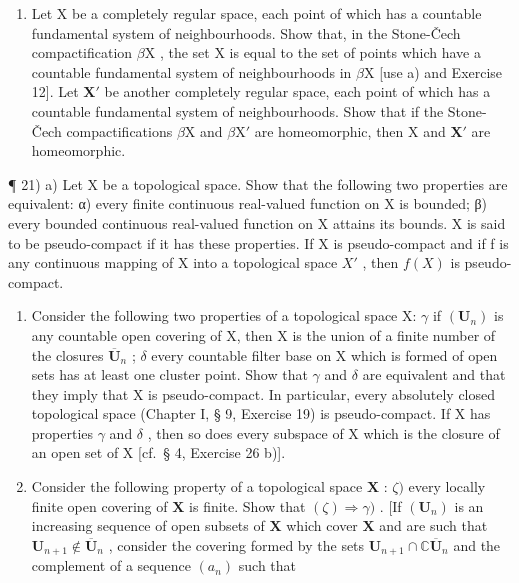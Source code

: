 \begin{enumerate}
\def\labelenumi{\alph{enumi})}
\setcounter{enumi}{1}
\tightlist
\item
  Let X be a completely regular space, each point of which has a countable fundamental system of neighbourhoods. Show that, in the Stone-Čech compactification \(\beta\mathrm{X}\) , the set X is equal to the set of points which have a countable fundamental system of neighbourhoods in \(\beta\mathrm{X}\) {[}use a) and Exercise 12{]}. Let \(\mathbf{X}'\) be another completely regular space, each point of which has a countable fundamental system of neighbourhoods. Show that if the Stone-Čech compactifications \(\beta\mathrm{X}\) and \(\beta\mathrm{X}'\) are homeomorphic, then X and \(\mathbf{X}'\) are homeomorphic.
\end{enumerate}

¶ 21) a) Let X be a topological space. Show that the following two properties are equivalent: α) every finite continuous real-valued function on X is bounded; β) every bounded continuous real-valued function on X attains its bounds. X is said to be pseudo-compact if it has these properties. If X is pseudo-compact and if f is any continuous mapping of X into a topological space \(X'\) , then \(f(X)\) is pseudo-compact.

\begin{enumerate}
\def\labelenumi{\alph{enumi})}
\setcounter{enumi}{1}
\item
  Consider the following two properties of a topological space X: \(\gamma\) if \((\mathbf{U}_n)\) is any countable open covering of X, then X is the union of a finite number of the closures \(\overline{\mathbf{U}}_n\) ; \(\delta\) every countable filter base on X which is formed of open sets has at least one cluster point. Show that \(\gamma\) and \(\delta\) are equivalent and that they imply that X is pseudo-compact. In particular, every absolutely closed topological space (Chapter I, § 9, Exercise 19) is pseudo-compact. If X has properties \(\gamma\) and \(\delta\) , then so does every subspace of X which is the closure of an open set of X {[}cf.~§ 4, Exercise 26 b){]}.
\item
  Consider the following property of a topological space \(\mathbf{X}\) : \(\zeta)\) every locally finite open covering of \(\mathbf{X}\) is finite. Show that \((\zeta) \Longrightarrow \gamma)\) . {[}If \((\mathbf{U}_n)\) is an increasing sequence of open subsets of \(\mathbf{X}\) which cover \(\mathbf{X}\) and are such that \(\mathbf{U}_{n+1} \notin \overline{\mathbf{U}}_n\) , consider the covering formed by the sets \(\mathbf{U}_{n+1} \cap \mathbb{C}\overline{\mathbf{U}}_n\) and the complement of a sequence \((a_n)\) such that
\end{enumerate}


